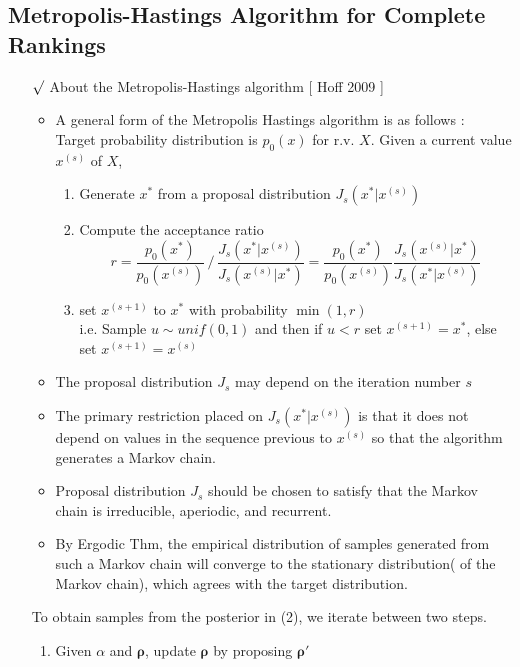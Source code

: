 \documentclass[12pt]{article}
\newcommand{\rmk}{$\surd$}
\begin{document}
\subsection{Metropolis-Hastings Algorithm for Complete Rankings}
\begin{itemize}
    \item[\rmk] About the Metropolis-Hastings algorithm [ Hoff 2009 ]
    \begin{itemize}
        \item A general form of the Metropolis Hastings algorithm is as follows : \\ Target probability distribution is $p_0(x)$ for r.v. $X$. Given a current value $x^{(s)}$ of $X$, 
        \begin{enumerate}
            \item Generate $x^{*}$ from a proposal distribution $J_s(x^{*}|x^{(s)})$
            \item Compute the acceptance ratio $$ r=\frac{p_0(x^*)}{p_0(x^{(s)})}\, /\, \frac{J_s(x^*|x^{(s)})}{J_s(x^{(s)}|x^*)} = \frac{p_0(x^*)}{p_0(x^{(s)})}\frac{J_s(x^{(s)}|x^*)}{J_s(x^*|x^{(s)})} $$
            \item set $x^{(s+1)}$ to $x^*$ with probability $\min (1, r)$ \\ i.e. Sample $u\sim unif(0,1)$ and then if $u<r$ set $x^{(s+1)}=x^*$, else set $x^{(s+1)}=x^{(s)}$
        \end{enumerate}
        \item The proposal distribution $J_s$ may depend on the iteration number $s$
        \item The primary restriction placed on $J_s(x^*|x^{(s)})$ is that it does not depend on values in the sequence previous to $x^{(s)}$ so that the algorithm generates a Markov chain.
        \item Proposal distribution $J_s$ should be chosen to satisfy that the Markov chain is irreducible, aperiodic, and recurrent. 
        \item By Ergodic Thm, the empirical distribution of samples generated from such a Markov chain will converge to the stationary distribution( of the Markov chain), which agrees with the target distribution.
    \end{itemize}
    To obtain samples from the posterior in (2), we iterate between two steps.
    \begin{enumerate}
        \item Given $\alpha$ and $\boldsymbol{\rho}$, update $\boldsymbol{\rho}$ by proposing $\boldsymbol{\rho}'$

\end{enumerate}
\end{itemize}
\end{document}
